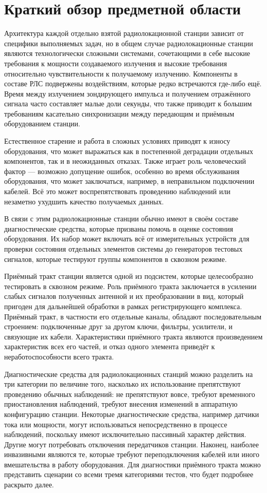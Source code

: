 \documentclass{report}
\begin{document}
\section{Краткий обзор предметной области}

Архитектура каждой отдельно взятой радиолокационной станции зависит от специфики выполняемых задач, но в общем случае радиолокационные станции являются технологически сложными системами, сочетающими в себе высокие требования к мощности создаваемого излучения и высокие требования относительно чувствительности к получаемому излучению. Компоненты в составе РЛС подвержены воздействиям, которые редко встречаются где-либо ещё. Время между излучением зондирующего импульса и получением отражённого сигнала часто составляет малые доли секунды, что также приводит к большим требованиям касательно синхронизации между передающим и приёмным оборудованием станции.

Естественное старение и работа в сложных условиях приводят к износу оборудования, что может выражаться как в постепенной деградации отдельных компонентов, так и в неожиданных отказах. Также играет роль человеческий фактор --- возможно допущение ошибок, особенно во время обслуживания оборудования, что может заключаться, например, в неправильном подключении кабелей. Всё это может воспрепятствовать проведению наблюдений или незаметно ухудшить качество получаемых данных.

В связи с этим радиолокационные станции обычно имеют в своём составе диагностические средства, которые призваны помочь в оценке состояния оборудования. Их набор может включать всё от измерительных устройств для проверки состояния отдельных элементов системы до генераторов тестовых сигналов, которые тестируют группы компонентов в сквозном режиме.

Приёмный тракт станции является одной из подсистем, которые целесообразно тестировать в сквозном режиме. Роль приёмного тракта заключается в усилении слабых сигналов полученных антенной и их преобразовании в вид, который пригоден для дальнейшей обработки в рамках регистрирующего комплекса. Приёмный тракт, в частности его отдельные каналы, обладают последовательным строением: подключенные друг за другом ключи, фильтры, усилители, и связующие их кабели. Характеристики приёмного тракта являются произведением характеристик всех его частей, и отказ одного элемента приведёт к неработоспособности всего тракта.

Диагностические средства для радиолокационных станций можно разделить на три категории по величине того, насколько их использование препятствуют проведению обычных наблюдений: не препятствуют вовсе, требуют временного приостановления наблюдений, требуют внесения изменений в аппаратную конфигурацию станции. Некоторые диагностические средства, например датчики тока или мощности, могут использоваться непосредственно в процессе наблюдений, поскольку имеют исключительно пассивный характер действия. Другие могут потребовать отключения передатчиков станции. Наконец, наиболее инвазивными являются те, которые требуют переподключения кабелей или иного вмешательства в работу оборудования. Для диагностики приёмного тракта можно представить сценарии со всеми тремя категориями тестов, что будет подробнее раскрыто далее.
\end{document}
